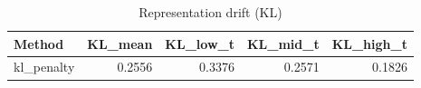 \begin{table}[htbp]
\centering
\caption{Representation drift (KL)}
\label{tab:repr-drift}
\begin{tabular}{lrrrr}
\toprule
\textbf{Method} & \textbf{KL\_mean} & \textbf{KL\_low\_t} & \textbf{KL\_mid\_t} & \textbf{KL\_high\_t} \\
\midrule
kl\_penalty & 0.2556 & 0.3376 & 0.2571 & 0.1826 \\
\bottomrule
\end{tabular}
\end{table}